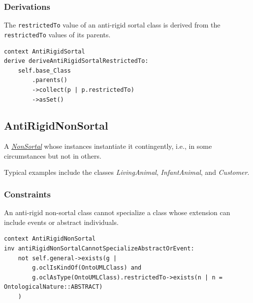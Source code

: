 \subsubsection{Derivations}

\begin{constraint}
\label{antiRigidSortalCannotSpecializeEvent}
The \texttt{restrictedTo} value of an anti-rigid sortal class is derived from the \texttt{restrictedTo} values of its parents.

\begin{lstlisting}[language=OCL]
context AntiRigidSortal 
derive deriveAntiRigidSortalRestrictedTo:
    self.base_Class
        .parents()
        ->collect(p | p.restrictedTo)
        ->asSet()
\end{lstlisting}
\end{constraint}

\subsection{AntiRigidNonSortal}
\label{stereotype:antiRigidNonSortal}

A \hyperref[stereotype:nonSortal]{\textit{NonSortal}} whose instances instantiate it contingently, i.e., in some circumstances but not in others.

Typical examples include the classes \textit{LivingAnimal}, \textit{InfantAnimal}, and \textit{Customer}.

\subsubsection{Constraints}

\begin{constraint}
\label{constraint:antiRigidNonSortalCannotSpecializeAbstractOrEvent}
An anti-rigid non-sortal class cannot specialize a class whose extension can include events or abstract individuals.

\begin{lstlisting}[language=OCL]
context AntiRigidNonSortal
inv antiRigidNonSortalCannotSpecializeAbstractOrEvent:
    not self.general->exists(g |
        g.oclIsKindOf(OntoUMLClass) and
        g.oclAsType(OntoUMLClass).restrictedTo->exists(n | n = OntologicalNature::ABSTRACT)
    )
\end{lstlisting}
\end{constraint}

